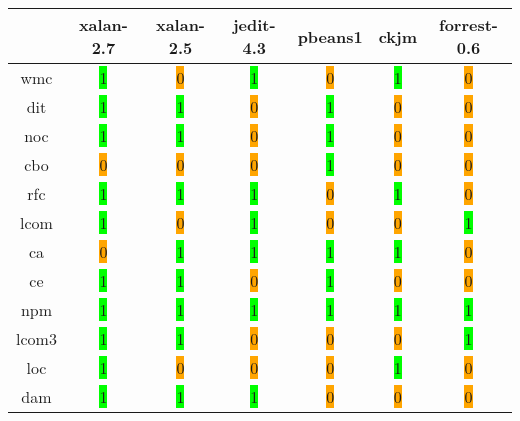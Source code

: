 \begin{table}[H]
\centering
    \begin{tabular}{|c|c|c|c|c|c|c|}
        \hline
         & xalan-2.7 & xalan-2.5 & jedit-4.3 & pbeans1 & ckjm & forrest-0.6 \\ \hline
        \acrshort{wmc} & \colorbox{lime}{1} & \colorbox{orange}{0} & \colorbox{lime}{1} & \colorbox{orange}{0} & \colorbox{lime}{1} & \colorbox{orange}{0} \\ \hline
        \acrshort{dit} & \colorbox{lime}{1} & \colorbox{lime}{1} & \colorbox{orange}{0} & \colorbox{lime}{1} & \colorbox{orange}{0} & \colorbox{orange}{0} \\ \hline
        \acrshort{noc} & \colorbox{lime}{1} & \colorbox{lime}{1} & \colorbox{orange}{0} & \colorbox{lime}{1} & \colorbox{orange}{0} & \colorbox{orange}{0} \\ \hline
        \acrshort{cbo} & \colorbox{orange}{0} & \colorbox{orange}{0} & \colorbox{orange}{0} & \colorbox{lime}{1} & \colorbox{orange}{0} & \colorbox{orange}{0} \\ \hline
        \acrshort{rfc} & \colorbox{lime}{1} & \colorbox{lime}{1} & \colorbox{lime}{1} & \colorbox{orange}{0} & \colorbox{lime}{1} & \colorbox{orange}{0} \\ \hline
        \acrshort{lcom} & \colorbox{lime}{1} & \colorbox{orange}{0} & \colorbox{lime}{1} & \colorbox{orange}{0} & \colorbox{orange}{0} & \colorbox{lime}{1} \\ \hline
        \acrshort{ca} & \colorbox{orange}{0} & \colorbox{lime}{1} & \colorbox{lime}{1} & \colorbox{lime}{1} & \colorbox{lime}{1} & \colorbox{orange}{0} \\ \hline
        \acrshort{ce} & \colorbox{lime}{1} & \colorbox{lime}{1} & \colorbox{orange}{0} & \colorbox{lime}{1} & \colorbox{orange}{0} & \colorbox{orange}{0} \\ \hline
        \acrshort{npm} & \colorbox{lime}{1} & \colorbox{lime}{1} & \colorbox{lime}{1} & \colorbox{lime}{1} & \colorbox{lime}{1} & \colorbox{lime}{1} \\ \hline
        \acrshort{lcom3} & \colorbox{lime}{1} & \colorbox{lime}{1} & \colorbox{orange}{0} & \colorbox{orange}{0} & \colorbox{orange}{0} & \colorbox{lime}{1} \\ \hline
        \acrshort{loc} & \colorbox{lime}{1} & \colorbox{orange}{0} & \colorbox{orange}{0} & \colorbox{orange}{0} & \colorbox{lime}{1} & \colorbox{orange}{0} \\ \hline
        \acrshort{dam} & \colorbox{lime}{1} & \colorbox{lime}{1} & \colorbox{lime}{1} & \colorbox{orange}{0} & \colorbox{orange}{0} & \colorbox{orange}{0} \\ \hline

\end{tabular}
\end{table}
